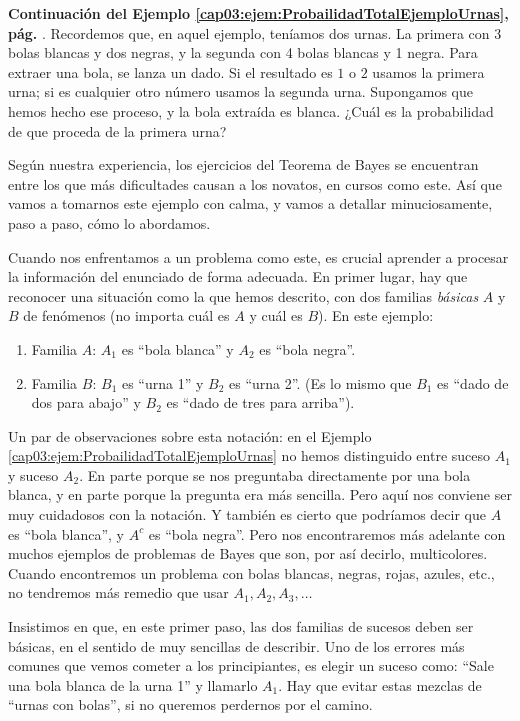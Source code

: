 \begin{Ejemplo}
    {\bf Continuación del Ejemplo \ref{cap03:ejem:ProbailidadTotalEjemploUrnas}, pág. \pageref{cap03:ejem:ProbailidadTotalEjemploUrnas}}\label{cap03:ejem:EjemploUrnasBayes}. 
    Recordemos que, en aquel ejemplo, teníamos dos urnas. La primera con 3 bolas blancas y dos negras, y la segunda con 4 bolas blancas y 1 negra. Para extraer una bola, se lanza un dado. Si el resultado es $1$ o $2$ usamos la primera urna; si es cualquier otro número usamos la segunda urna.
    Supongamos que hemos hecho ese proceso, y la bola extraída es blanca. ¿Cuál es la probabilidad de que proceda de la primera urna?

    Según nuestra experiencia, los ejercicios del Teorema de Bayes se encuentran entre los que más dificultades causan a los novatos, en cursos como este. Así que vamos a tomarnos este ejemplo con calma, y vamos a detallar minuciosamente, paso a paso, cómo lo abordamos.

    Cuando nos enfrentamos a un problema como este, es crucial aprender a procesar la información del enunciado de forma adecuada. En primer lugar, hay que reconocer una situación como la que hemos descrito, con dos familias {\em básicas} $A$ y $B$ de fenómenos (no importa cuál es $A$ y cuál es $B$). En este ejemplo:
    \begin{enumerate}
    \item Familia $A$: $A_1$ es ``bola blanca'' y $A_2$ es ``bola negra''.
    \item Familia $B$: $B_1$ es ``urna 1'' y $B_2$ es ``urna 2''. (Es lo mismo que $B_1$ es ``dado de dos para abajo'' y $B_2$ es ``dado de tres para arriba'').
    \end{enumerate}
    Un par de observaciones sobre esta notación: en el Ejemplo \ref{cap03:ejem:ProbailidadTotalEjemploUrnas} no hemos distinguido entre suceso $A_1$ y suceso $A_2$. En parte porque se nos preguntaba directamente por una bola blanca, y en parte porque la pregunta era más sencilla. Pero aquí nos conviene ser muy cuidadosos con la notación. Y también es cierto que podríamos decir que $A$ es ``bola blanca'', y $A^c$ es ``bola negra''. Pero nos encontraremos más adelante con muchos ejemplos de problemas de Bayes que son, por así decirlo, multicolores. Cuando encontremos un problema con bolas blancas, negras, rojas, azules, etc., no tendremos más remedio que usar $A_1, A_2, A_3,\ldots$

    Insistimos en que, en este primer paso, las dos familias de sucesos deben ser básicas, en el sentido de muy sencillas de describir. Uno de los errores más comunes que vemos cometer a los principiantes, es elegir un suceso como:
    ``Sale una bola blanca de la urna 1''
    y llamarlo $A_1$. Hay que evitar estas mezclas de ``urnas con bolas'', si no queremos perdernos por el camino.


\end{Ejemplo}
